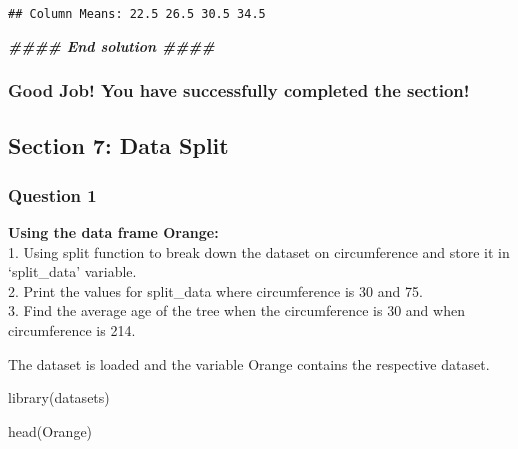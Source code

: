 \documentclass[
]{article}
\newenvironment{Shaded}{\begin{snugshade}}{\end{snugshade}}
\newcommand{\DocumentationTok}[1]{\textcolor[rgb]{0.56,0.35,0.01}{\textbf{\textit{#1}}}}
\newcommand{\FunctionTok}[1]{\textcolor[rgb]{0.00,0.00,0.00}{#1}}
\newcommand{\NormalTok}[1]{#1}
\begin{document}
\begin{verbatim}
## Column Means: 22.5 26.5 30.5 34.5
\end{verbatim}

\begin{Shaded}
\begin{Highlighting}[]
\DocumentationTok{\#\#\#\# End solution \#\#\#\#}
\end{Highlighting}
\end{Shaded}

\hypertarget{good-job-you-have-successfully-completed-the-section-5}{%
\subsubsection{Good Job! You have successfully completed the
section!}\label{good-job-you-have-successfully-completed-the-section-5}}

\hypertarget{section-7-data-split}{%
\subsection{Section 7: Data Split}\label{section-7-data-split}}

\hypertarget{question-1-6}{%
\subsubsection{Question 1}\label{question-1-6}}

\textbf{Using the data frame Orange:}\\
1. Using split function to break down the dataset on circumference and
store it in `split\_data' variable.\\
2. Print the values for split\_data where circumference is 30 and 75.\\
3. Find the average age of the tree when the circumference is 30 and
when circumference is 214.

The dataset is loaded and the variable Orange contains the respective
dataset.

\begin{Shaded}
\begin{Highlighting}[]
\FunctionTok{library}\NormalTok{(datasets)}
\end{Highlighting}
\end{Shaded}

\begin{Shaded}
\begin{Highlighting}[]
\FunctionTok{head}\NormalTok{(Orange)}
\end{Highlighting}
\end{Shaded}
\end{document}
